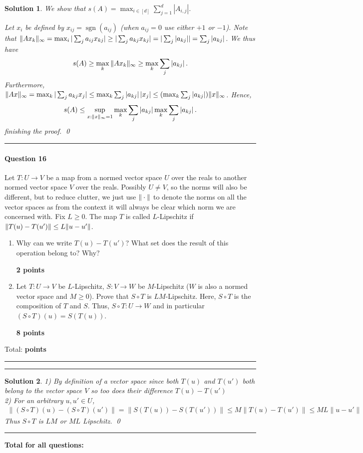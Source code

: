 \documentclass{article}
\DeclareMathOperator{\sgn}{sgn}
\DeclareMathOperator*{\1}{\mathbbm{1}}
\newcounter{DocPoints} %
\newcounter{QuestionPoints} %
\newcommand{\points}[1]{%
	\par\mbox{}\par\noindent\hfill {\bf #1 points}%
	\addtocounter{DocPoints}{#1}
	\addtocounter{QuestionPoints}{#1}
}
\newcommand{\tpoints}[1]{        %
	\ifthenelse{\isempty{#1}}%
	{%
	}%
	{%
		\addtocounter{DocPoints}{#1}
		\addtocounter{QuestionPoints}{#1}
	}													 %
	\par\mbox{}\par\noindent\hfill {Total: \bf \arabic{QuestionPoints}\xspace points}\par\mbox{}\par\hrule\hrule
	\setcounter{QuestionPoints}{0}
}
\newtheorem*{solution*}{Solution}
\begin{document}
\begin{solution*}
We show that $s(A) = \max_{i \in [d]} \sum_{j=1}^d |A_{i,j}|$.

Let $x_i$ be defined by $x_{ij} = \sgn(a_{ij})$ (when $a_{ij}=0$ use either $+1$ or $-1$).
Note that $\|A x_k\|_\infty = \max_i | \sum_j a_{ij} x_{kj} | \ge |\sum_j a_{kj}x_{kj} | = | \sum_j |a_{kj}|| = \sum_{j} |a_{kj}|$.
We thus have
\begin{align*}
s(A)
\ge \max_k \|A x_k\|_\infty 
\ge \max_k \sum_j |a_{kj}|\,.
\end{align*}
Furthermore, 
$\|A x\|_\infty
 = \max_k |\sum_j a_{kj} x_j | 
 \le \max_k \sum_j |a_{kj}|\, | x_j | 
 \le (\max_k \sum_j |a_{kj}| ) \|x\|_\infty$. Hence,
\begin{align*}
s(A) \le \sup_{x:\|x\|_\infty=1} \max_k  \sum_j |a_{kj}| 
\max_k  \sum_j |a_{kj}| \,.
\end{align*}
finishing the proof.
\qed\par\bigskip\par\hrule
\end{solution*}


\paragraph{Question 16}
Let $T:U\to V$ be a map from a normed vector space $U$ over the reals to another normed vector space $V$ over the reals. Possibly $U\ne V$, so the norms will also be different, but to reduce clutter, we just use $\|\cdot\|$ to denote the norms on all the vector spaces as from the context it will always be clear which norm we are concerned with.
Fix $L\ge 0$. The map $T$ is called $L$-Lipschitz if $\|T(u)-T(u')\|\le L \|u-u'\|$. 
\begin{enumerate}
\item Why can we write $T(u)-T(u')$? What set does the result of this operation belong to? Why?
\points{2}
\item Let $T:U\to V$ be $L$-Lipschitz, $S:V \to W$ be $M$-Lipschitz ($W$ is also a normed vector space and $M\ge 0$).
Prove that $S \circ T$ is $LM$-Lipschitz. Here, $S\circ T$ is the composition of $T$ and $S$. Thus, $S\circ T: U \to W$ and in particular $(S\circ T)(u) = S(T(u))$.
\points{8}
\end{enumerate}
\tpoints{}

\begin{solution*}
1) By definition of a vector space since both $T(u)$ and $T(u')$ both belong to the vector space $V$ so too does their difference $T(u) - T(u')$ \\
2) For an arbitrary $u,u' \in U$,
\begin{align*}
\lVert (S \circ T)(u) - (S \circ T)(u') \rVert = \lVert S(T(u)) - S(T(u')) \rVert \leq M \lVert T(u) - T(u') \rVert \leq ML \lVert u - u' \rVert
\end{align*}
Thus $S \circ T$ is $LM$ or $ML$ Lipschitz.
\qed\par\bigskip\par\hrule
\end{solution*}


\bigskip
\bigskip

\noindent
\textbf{
Total for all questions: }
\end{document}
